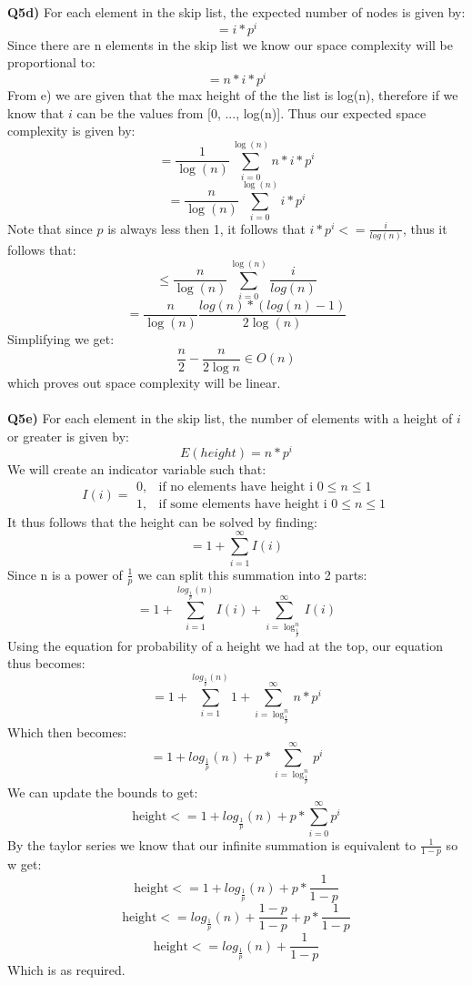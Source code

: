 \documentclass[12pt]{article}
\begin{document}
\newpage
\begin{adjustwidth}{0em}{0pt}
\textbf{Q5d)}
For each element in the skip list, the expected number of nodes is given by:
\[ = i*p^i \]
Since there are n elements in the skip list we know our space complexity will be proportional to: 
\[ = n*i*p^i \]
From e) we are given that the max height of the the list is log(n), therefore  if we know that $i$ can be the values from [0, ..., log(n)]. Thus our expected space complexity is given by:
\[ = \frac{1}{\log(n)}\sum^{\log(n)}_{i=0}n*i*p^i \]
\[ = \frac{n}{\log(n)}\sum^{\log(n)}_{i=0}i*p^i \]
Note that since $p$ is always less then 1, it follows that $i*p^i <= \frac{i}{log(n)}$, thus it follows that:
\[ \leq \frac{n}{\log(n)}\sum^{\log(n)}_{i=0}\frac{i}{log(n)} \]
\[ = \frac{n}{\log(n)}\frac{log(n)*(log(n)-1)}{2\log(n)} \]
Simplifying we get:
\[ \frac{n}{2} - \frac{n}{2\log{n}} \in O(n) \]
which proves out space complexity will be linear. \\ \\ 
\textbf{Q5e)}
For each element in the skip list, the number of elements with a height of $i$ or greater is given by:
\[ E(height) = n*p^i \]
We will create an indicator variable such that:
\[
 I(i) = \begin{array}{lr}
        0, & \text{if no elements have height i } 0\leq n\leq 1\\
        1, & \text{if some elements have height i } 0\leq n\leq 1
        \end{array}
\]
It thus follows that the height can be solved by finding:
\[ = 1 + \sum^{\infty}_{i=1} I(i) \]
Since n is a power of $\frac{1}{p}$ we can split this summation into 2 parts:
\[ = 1 + \sum^{log_{\frac{1}{p}}(n)}_{i=1} I(i) + \sum^{\infty}_{i= \log_{\frac{1}{p}}^n} I(i) \]
Using the equation for probability of a height we had at the top, our equation thus becomes:
\[ = 1 + \sum^{log_{\frac{1}{p}}(n)}_{i=1} 1 + \sum^{\infty}_{i= \log_{\frac{1}{p}}^n} n*p^i \]
Which then becomes:
\[ = 1 + log_{\frac{1}{p}}(n) + p*\sum^{\infty}_{i= \log_{\frac{1}{p}}^n} p^i \]
We can update the bounds to get:
\[ \text{height} <= 1 + log_{\frac{1}{p}}(n) + p*\sum^{\infty}_{i=0} p^i \]
By the taylor series we know that our infinite summation is equivalent to $\frac{1}{1-p}$ so w get:
\[ \text{height} <= 1 + log_{\frac{1}{p}}(n) + p*\frac{1}{1-p} \]
\[ \text{height} <= log_{\frac{1}{p}}(n) + \frac{1-p}{1-p} + p*\frac{1}{1-p} \]
\[ \text{height} <= log_{\frac{1}{p}}(n) + \frac{1}{1-p} \]
Which is as required.
\end{adjustwidth} 
\end{document}
